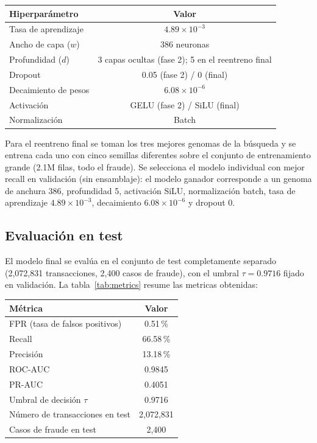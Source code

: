 \documentclass[11pt,a4paper]{article}
\begin{document}
\begin{center}
\begin{tabular}{lc}
\toprule
Hiperparámetro & Valor \\
\midrule
Tasa de aprendizaje & $4.89 \times 10^{-3}$ \\
Ancho de capa ($w$) & 386 neuronas \\
Profundidad ($d$) & 3 capas ocultas (fase 2); 5 en el reentreno final \\
Dropout & 0.05 (fase 2) / 0 (final) \\
Decaimiento de pesos & $6.08 \times 10^{-6}$ \\
Activación & GELU (fase 2) / SiLU (final) \\
Normalización & Batch \\
\bottomrule
\end{tabular}
\end{center}

Para el reentreno final se toman los tres mejores genomas de la búsqueda y se entrena cada uno con cinco semillas diferentes sobre el conjunto de entrenamiento grande (2.1M filas, todo el fraude). Se selecciona el modelo individual con mejor recall en validación (sin ensamblaje): el modelo ganador corresponde a un genoma de anchura 386, profundidad 5, activación SiLU, normalización batch, tasa de aprendizaje $4.89 \times 10^{-3}$, decaimiento $6.08 \times 10^{-6}$ y dropout 0.

\subsection{Evaluación en test}
El modelo final se evalúa en el conjunto de test completamente separado (2,072,831 transacciones, 2,400 casos de fraude), con el umbral $\tau = 0.9716$ fijado en validación. La tabla~\ref{tab:metrics} resume las metricas obtenidas:

\begin{center}
\begin{tabular}{lc}
\toprule
Métrica & Valor \\
\midrule
FPR (tasa de falsos positivos) & 0.51\,\% \\
Recall & 66.58\,\% \\
Precisión & 13.18\,\% \\
ROC-AUC & 0.9845 \\
PR-AUC & 0.4051 \\
Umbral de decisión $\tau$ & 0.9716 \\
Número de transacciones en test & 2,072,831 \\
Casos de fraude en test & 2,400 \\
\bottomrule
\end{tabular}
\end{center}
\end{document}
